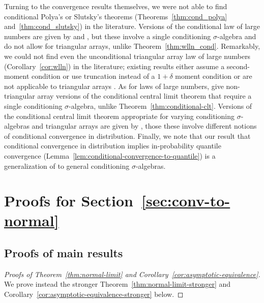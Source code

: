 \documentclass[12pt]{article}
\makeatletter
\theoremstyle{definition}
\theoremstyle{remark}
\newcommand\newtarget[2]{\Hy@raisedlink{\hypertarget{#1}{}}#2}
\makeatother
\begin{document}
Turning to the convergence results themselves, we were not able to find conditional Polya's or Slutsky's theorems (Theorems~\ref{thm:cond_polya} and~\ref{thm:cond_slutsky}) in the literature. Versions of the conditional law of large numbers are given by \cite{Majerek2005a} and \cite{PrakasaRao2009}, but these involve a single conditioning $\sigma$-algebra and do not allow for triangular arrays, unlike Theorem~\ref{thm:wlln_cond}. Remarkably, we could not find even the unconditional triangular array law of large numbers (Corollary~\ref{cor:wlln}) in the literature; existing results either assume a second-moment condition or use truncation \citep[Theorems 2.2.4 and 2.2.6, respectively]{Durrett2010} instead of a $1+\delta$ moment condition or are not applicable to triangular arrays \citep[Lemma 19]{Shah2018}. As for laws of large numbers, \citet{Grzenda2008, PrakasaRao2009, Yuan2014} give non-triangular array versions of the conditional central limit theorem that require a single conditioning $\sigma$-algebra, unlike Theorem~\ref{thm:conditional-clt}. Versions of the conditional central limit theorem appropriate for varying conditioning $\sigma$-algebras and triangular arrays are given by \citet{Dedecker2002, bulinski2017conditional}, those these involve different notions of conditional convergence in distribution. %
Finally, we note that our result that conditional convergence in distribution implies in-probability quantile convergence (Lemma~\ref{lem:conditional-convergence-to-quantile}) is a generalization of \citet[Lemma 3]{Wang2020b} to general conditioning $\sigma$-algebras.

\section{Proofs for Section~\ref{sec:conv-to-normal}}

\subsection{Proofs of main results}

\begin{proof}[Proofs of Theorem~\ref{thm:normal-limit} and Corollary~\ref{cor:asymptotic-equivalence}] \newtarget{proof:thm:normal-limit}{}
We prove instead the stronger Theorem~\ref{thm:normal-limit-stronger} and Corollary~\ref{cor:asymptotic-equivalence-stronger} below.
\end{proof}
\end{document}
